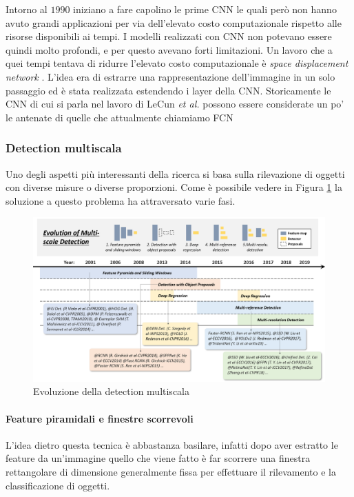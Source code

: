 Intorno al $1990$ iniziano a fare capolino le prime \ac{CNN} \cite{vaillant1994original} le quali però non hanno avuto grandi applicazioni per via dell'elevato costo computazionale rispetto alle risorse disponibili ai tempi. I modelli realizzati con \ac{CNN} non potevano essere quindi molto profondi, e per questo avevano forti limitazioni. Un lavoro che a quei tempi tentava di ridurre l'elevato costo computazionale è \textit{space displacement network} \cite{lecun1998gradient}. L'idea era di estrarre una rappresentazione dell'immagine in un solo passaggio ed è stata realizzata estendendo i layer della \ac{CNN}. Storicamente le \ac{CNN} di cui si parla nel lavoro di LeCun \textit{et al.} \cite{lecun1998gradient} possono essere considerate un po' le antenate di quelle che attualmente chiamiamo \ac{FCN} \cite{long2015fully} \cite{chen2014semantic}
\subsubsection{Detection multiscala}
\label{subsec:multiscale_detection}
Uno degli aspetti più interessanti della ricerca si basa sulla rilevazione di oggetti con diverse misure o diverse proporzioni. Come è possibile vedere in Figura \ref{fig:multi_scale_history} la soluzione a questo problema ha attraversato varie fasi.
\begin{figure}
    \centering
    \includegraphics[width=\textwidth]{images/evol-multiscale.png}
    \caption{Evoluzione della detection multiscala \cite{DBLP:journals/corr/abs-1905-05055}}
    \label{fig:multi_scale_history}
\end{figure}
\paragraph{Feature piramidali e finestre scorrevoli}
L'idea dietro questa tecnica è abbastanza basilare, infatti dopo aver estratto le feature da un'immagine quello che viene fatto è far scorrere una finestra rettangolare di dimensione generalmente fissa per effettuare il rilevamento e la classificazione di oggetti. 

